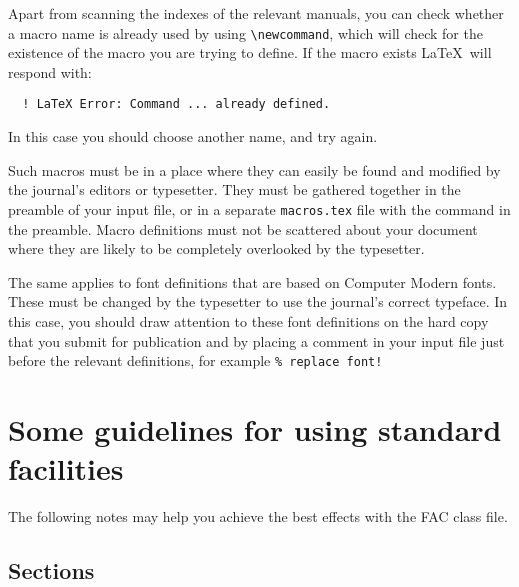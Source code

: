 \documentclass{fac}
\begin{document}
Apart from scanning the indexes of the relevant manuals, you can check
whether a macro name is already used by using \verb"\newcommand", which
will check for the existence of the macro you are trying to define.
If the macro exists \LaTeX\ will respond with:
%
\begin{verbatim}
  ! LaTeX Error: Command ... already defined.
\end{verbatim}
%
In this case you should choose another name, and try again.

Such macros must be in a place where they can easily be found and
modified by the journal's editors or typesetter. They must be gathered
together in the preamble of your input file, or in a separate
\verb"macros.tex" file with the command \verb"" in the
preamble. Macro definitions must not be scattered about your document
where they are likely to be completely overlooked by the typesetter.

The same applies to font definitions that are based on Computer Modern
fonts. These must be changed by the typesetter to use the journal's
correct typeface. In this case, you should draw
attention to these font definitions on the hard copy that you submit for
publication and by placing a comment in your input file just before the
relevant definitions, for example \verb"% replace font!"

\section{Some guidelines for using standard facilities}

The following notes may help you achieve the best effects with the FAC
class file.

\subsection{Sections}
\end{document}
